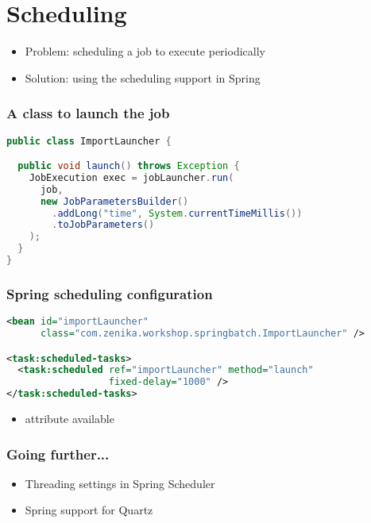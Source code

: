 \section{Scheduling}

\begin{frame}
 \begin{itemize}
  \item Problem: scheduling a job to execute periodically
  \item Solution: using the scheduling support in Spring
 \end{itemize}
\end{frame}

\begin{frame}[fragile]
 \frametitle{A class to launch the job}
 \begin{lstlisting}[language=Java]
public class ImportLauncher {

  public void launch() throws Exception {
    JobExecution exec = jobLauncher.run(
      job,
      new JobParametersBuilder() 
        .addLong("time", System.currentTimeMillis())
        .toJobParameters()
    );
  }
}
 \end{lstlisting}
\end{frame}

\begin{frame}[fragile]
 \frametitle{Spring scheduling configuration}
 \begin{lstlisting}[language=XML]
<bean id="importLauncher"
      class="com.zenika.workshop.springbatch.ImportLauncher" />

<task:scheduled-tasks>
  <task:scheduled ref="importLauncher" method="launch" 
                  fixed-delay="1000" />
</task:scheduled-tasks>
 \end{lstlisting}
 \begin{itemize}
  \item {} attribute available
 \end{itemize}

\end{frame}

\begin{frame}
 \frametitle{Going further...}
 \begin{itemize}
  \item Threading settings in Spring Scheduler
  \item Spring support for Quartz
 \end{itemize}
\end{frame}

